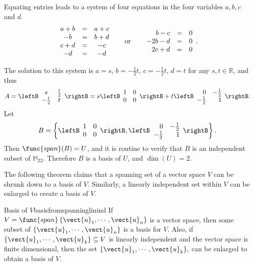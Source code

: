 \begin{solution}
Equating entries leads to a system of four equations in the four
variables $a,b,c$ and $d$.
\[ \begin{array}{ccc}
a+b & = & a + c \\
-b & = & b + d \\
c + d & = & -c \\
-d & = & -d \end{array} \hspace*{.2in}\mbox{ or }\hspace*{.2in}
\begin{array}{rcc}
b - c & = & 0 \\
-2b - d & = & 0 \\
2c + d & = & 0 
\end{array}.  \] 

The solution to this system is
$a=s$, $b=-\frac{1}{2}t$, $c=-\frac{1}{2}t$,  $d=t$ for any $s,t\in\mathbb{R}$, 
and thus 
\[ A=\leftB\begin{array}{cc} s & \frac{t}{2} \\
-\frac{t}{2} & t \end{array}\rightB
= s\leftB\begin{array}{cc} 1 & 0 \\ 0 & 0 \end{array}\rightB
+ t\leftB\begin{array}{rr} 0  & -\frac{1}{2} \\ 
-\frac{1}{2} & 1 \end{array}\rightB .\]
Let 
\[ B=\left\{ 
\leftB\begin{array}{cc} 1 & 0 \\ 0 & 0 \end{array}\rightB,
\leftB\begin{array}{rr} 0  & -\frac{1}{2} \\
-\frac{1}{2} & 1 \end{array}\rightB\right\}.\]
Then $\func{span}(B)=U$, and it is routine to verify that $B$ is
an independent subset of $\mathbb{M}_{22}$.  
Therefore $B$ is a basis of $U$, and $\dim(U)=2$.
\end{solution}

The following theorem claims that a spanning set of a vector space $V$ can be shrunk down to a basis of $V$. Similarly, a linearly independent set within $V$ can be enlarged to create a basis of $V$.

\begin{theorem}{Basis of $V$}{basisfromspanninglinind}
 If $V=\func{span}\left\{ \vect{u}_{1},\cdots ,\vect{u}
_{n}\right\} $ is a vector space, then some subset of $\{\vect{u}_{1},\cdots ,\vect{u}_{n}\}$
is a basis for $V.$ Also, if $\{\vect{u}_{1},\cdots ,\vect{u}
_{k}\}\subseteq V$ is linearly independent and the vector space is finite
dimensional,
then the set $\{
\vect{u}_{1},\cdots ,\vect{u}_{k}\},$ can be enlarged to obtain a basis
of $V$.
\end{theorem}

